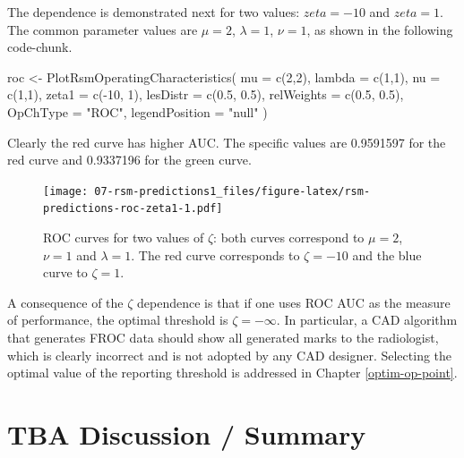 \documentclass[
]{book}
\newenvironment{Shaded}{\begin{snugshade}}{\end{snugshade}}
\newcommand{\AttributeTok}[1]{\textcolor[rgb]{0.77,0.63,0.00}{#1}}
\newcommand{\DecValTok}[1]{\textcolor[rgb]{0.00,0.00,0.81}{#1}}
\newcommand{\FloatTok}[1]{\textcolor[rgb]{0.00,0.00,0.81}{#1}}
\newcommand{\FunctionTok}[1]{\textcolor[rgb]{0.00,0.00,0.00}{#1}}
\newcommand{\NormalTok}[1]{#1}
\newcommand{\OtherTok}[1]{\textcolor[rgb]{0.56,0.35,0.01}{#1}}
\newcommand{\SpecialCharTok}[1]{\textcolor[rgb]{0.00,0.00,0.00}{#1}}
\newcommand{\StringTok}[1]{\textcolor[rgb]{0.31,0.60,0.02}{#1}}
\begin{document}
The dependence is demonstrated next for two values: \(zeta = -10\) and \(zeta = 1\). The common parameter values are \(\mu = 2\), \(\lambda = 1\), \(\nu = 1\), as shown in the following code-chunk.

\begin{Shaded}
\begin{Highlighting}[]
\NormalTok{roc }\OtherTok{\textless{}{-}} \FunctionTok{PlotRsmOperatingCharacteristics}\NormalTok{(}
     \AttributeTok{mu =} \FunctionTok{c}\NormalTok{(}\DecValTok{2}\NormalTok{,}\DecValTok{2}\NormalTok{),}
     \AttributeTok{lambda =} \FunctionTok{c}\NormalTok{(}\DecValTok{1}\NormalTok{,}\DecValTok{1}\NormalTok{),}
     \AttributeTok{nu =} \FunctionTok{c}\NormalTok{(}\DecValTok{1}\NormalTok{,}\DecValTok{1}\NormalTok{),}
     \AttributeTok{zeta1 =} \FunctionTok{c}\NormalTok{(}\SpecialCharTok{{-}}\DecValTok{10}\NormalTok{, }\DecValTok{1}\NormalTok{),}
     \AttributeTok{lesDistr =} \FunctionTok{c}\NormalTok{(}\FloatTok{0.5}\NormalTok{, }\FloatTok{0.5}\NormalTok{),}
     \AttributeTok{relWeights =} \FunctionTok{c}\NormalTok{(}\FloatTok{0.5}\NormalTok{, }\FloatTok{0.5}\NormalTok{),}
     \AttributeTok{OpChType =} \StringTok{"ROC"}\NormalTok{,}
     \AttributeTok{legendPosition =} \StringTok{"null"}
\NormalTok{)}
\end{Highlighting}
\end{Shaded}

Clearly the red curve has higher AUC. The specific values are 0.9591597 for the red curve and 0.9337196 for the green curve.

\begin{figure}
\centering
\texttt{[image: 07-rsm-predictions1\_files/figure-latex/rsm-predictions-roc-zeta1-1.pdf]}
\caption{\label{fig:rsm-predictions-roc-zeta1}ROC curves for two values of \(\zeta\): both curves correspond to \(\mu = 2\), \(\nu = 1\) and \(\lambda = 1\). The red curve corresponds to \(\zeta = -10\) and the blue curve to \(\zeta = 1\).}
\end{figure}

A consequence of the \(\zeta\) dependence is that if one uses ROC AUC as the measure of performance, the optimal threshold is \(\zeta = -\infty\). In particular, a CAD algorithm that generates FROC data should show all generated marks to the radiologist, which is clearly incorrect and is not adopted by any CAD designer. Selecting the optimal value of the reporting threshold is addressed in Chapter \ref{optim-op-point}.

\hypertarget{rsm-predictions-discussion-summary}{%
\section{TBA Discussion / Summary}\label{rsm-predictions-discussion-summary}}
\end{document}

